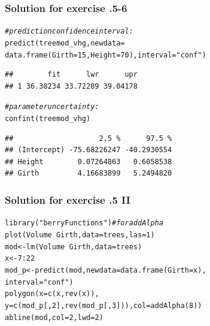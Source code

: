 \documentclass[xcolor=table, xcolor=dvipsnames]{beamer}\usepackage[]{graphicx}\usepackage[]{color}
\makeatletter
\newcommand{\hlnum}[1]{\textcolor[rgb]{0,0,0}{#1}}
\newcommand{\hlstr}[1]{\textcolor[rgb]{0.545,0.137,0.137}{#1}}
\newcommand{\hlcom}[1]{\textcolor[rgb]{0,0.392,0}{\textit{#1}}}
\newcommand{\hlopt}[1]{\textcolor[rgb]{0,0,0}{#1}}
\newcommand{\hlstd}[1]{\textcolor[rgb]{0,0,0}{#1}}
\newcommand{\hlkwb}[1]{\textcolor[rgb]{0,0,0}{#1}}
\newcommand{\hlkwc}[1]{\textcolor[rgb]{1,0,1}{#1}}
\newcommand{\hlkwd}[1]{\textcolor[rgb]{0,0,1}{#1}}
\newenvironment{kframe}{%
 \def\at@end@of@kframe{}%
 \ifinner\ifhmode%
  \def\at@end@of@kframe{\end{minipage}}%
  \begin{minipage}{\columnwidth}%
 \fi\fi%
 \def\FrameCommand##1{\hskip\@totalleftmargin \hskip-\fboxsep
 \colorbox{shadecolor}{##1}\hskip-\fboxsep
     \hskip-\linewidth \hskip-\@totalleftmargin \hskip\columnwidth}%
 \MakeFramed {\advance\hsize-\width
   \@totalleftmargin\z@ \linewidth\hsize
   \@setminipage}}%
 {\par\unskip\endMakeFramed%
 \at@end@of@kframe}
\newenvironment{knitrout}{}{} %
\newcounter{exercisecount}
\makeatother
\begin{document}
\begin{frame}[fragile]\frametitle{Solution for exercise .5-6}
\begin{knitrout}
\color{fgcolor}\begin{kframe}
\begin{alltt}
\hlcom{# prediction confidence interval:}
\hlkwd{predict}\hlstd{(treemod_vhg,} \hlkwc{newdata}\hlstd{=}
    \hlkwd{data.frame}\hlstd{(}\hlkwc{Girth}\hlstd{=}\hlnum{15}\hlstd{,} \hlkwc{Height}\hlstd{=}\hlnum{70}\hlstd{),} \hlkwc{interval}\hlstd{=}\hlstr{"conf"}\hlstd{)}
\end{alltt}
\begin{verbatim}
##        fit      lwr      upr
## 1 36.38234 33.72289 39.04178
\end{verbatim}
\begin{alltt}
\hlcom{# parameter uncertainty:}
\hlkwd{confint}\hlstd{(treemod_vhg)}
\end{alltt}
\begin{verbatim}
##                    2.5 %      97.5 %
## (Intercept) -75.68226247 -40.2930554
## Height        0.07264863   0.6058538
## Girth         4.16683899   5.2494820
\end{verbatim}
\end{kframe}
\end{knitrout}
\end{frame}


\begin{frame}[fragile]\frametitle{Solution for exercise .5 II}
\begin{knitrout}
\color{fgcolor}\begin{kframe}
\begin{alltt}
\hlkwd{library}\hlstd{(}\hlstr{"berryFunctions"}\hlstd{)} \hlcom{# for addAlpha}
\hlkwd{plot}\hlstd{(Volume}\hlopt{~}\hlstd{Girth,} \hlkwc{data}\hlstd{=trees,} \hlkwc{las}\hlstd{=}\hlnum{1}\hlstd{)}
\hlstd{mod} \hlkwb{<-} \hlkwd{lm}\hlstd{(Volume}\hlopt{~}\hlstd{Girth,} \hlkwc{data}\hlstd{=trees)}
\hlstd{x} \hlkwb{<-} \hlnum{7}\hlopt{:}\hlnum{22}
\hlstd{mod_p} \hlkwb{<-} \hlkwd{predict}\hlstd{(mod,} \hlkwc{newdata}\hlstd{=}\hlkwd{data.frame}\hlstd{(}\hlkwc{Girth}\hlstd{=x),}
                 \hlkwc{interval}\hlstd{=}\hlstr{"conf"}\hlstd{)}
\hlkwd{polygon}\hlstd{(}\hlkwc{x}\hlstd{=}\hlkwd{c}\hlstd{(x,} \hlkwd{rev}\hlstd{(x)),}
        \hlkwc{y}\hlstd{=}\hlkwd{c}\hlstd{(mod_p[,}\hlnum{2}\hlstd{],} \hlkwd{rev}\hlstd{(mod_p[,}\hlnum{3}\hlstd{])),} \hlkwc{col}\hlstd{=}\hlkwd{addAlpha}\hlstd{(}\hlnum{8}\hlstd{))}
\hlkwd{abline}\hlstd{(mod,} \hlkwc{col}\hlstd{=}\hlnum{2}\hlstd{,} \hlkwc{lwd}\hlstd{=}\hlnum{2}\hlstd{)}
\end{alltt}
\end{kframe}
\end{knitrout}
\end{frame}
\end{document}
